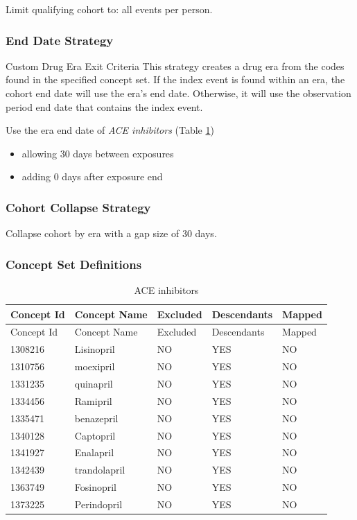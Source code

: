 \documentclass[11pt]{book}
\providecommand{\tightlist}{%
  \setlength{\itemsep}{0pt}\setlength{\parskip}{0pt}}
\theoremstyle{definition}
\theoremstyle{definition}
\theoremstyle{definition}
\theoremstyle{remark}
\begin{document}
Limit qualifying cohort to: all events per person.

\hypertarget{end-date-strategy}{%
\subsubsection*{End Date Strategy}\label{end-date-strategy}}

Custom Drug Era Exit Criteria
This strategy creates a drug era from the codes found in the specified concept set. If the index event is found within an era, the cohort end date will use the era's end date. Otherwise, it will use the observation period end date that contains the index event.

Use the era end date of \emph{ACE inhibitors} (Table \ref{tab:aceInhibitors})

\begin{itemize}
\tightlist
\item
  allowing 30 days between exposures
\item
  adding 0 days after exposure end
\end{itemize}

\hypertarget{cohort-collapse-strategy}{%
\subsubsection*{Cohort Collapse Strategy}\label{cohort-collapse-strategy}}

Collapse cohort by era with a gap size of 30 days.

\hypertarget{concept-set-definitions}{%
\subsubsection*{Concept Set Definitions}\label{concept-set-definitions}}

\begin{longtable}[]{@{}lllll@{}}
\caption{\label{tab:aceInhibitors} ACE inhibitors}\tabularnewline
\toprule
Concept Id & Concept Name & Excluded & Descendants & Mapped\tabularnewline
\midrule
\endfirsthead
\toprule
Concept Id & Concept Name & Excluded & Descendants & Mapped\tabularnewline
\midrule
\endhead
1308216 & Lisinopril & NO & YES & NO\tabularnewline
1310756 & moexipril & NO & YES & NO\tabularnewline
1331235 & quinapril & NO & YES & NO\tabularnewline
1334456 & Ramipril & NO & YES & NO\tabularnewline
1335471 & benazepril & NO & YES & NO\tabularnewline
1340128 & Captopril & NO & YES & NO\tabularnewline
1341927 & Enalapril & NO & YES & NO\tabularnewline
1342439 & trandolapril & NO & YES & NO\tabularnewline
1363749 & Fosinopril & NO & YES & NO\tabularnewline
1373225 & Perindopril & NO & YES & NO\tabularnewline
\bottomrule
\end{longtable}
\end{document}

